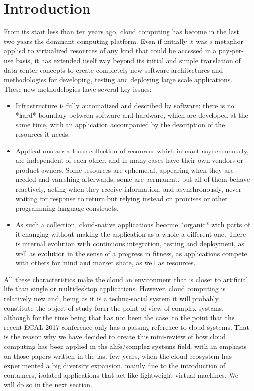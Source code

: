 \documentclass[utf8]{frontiersSCNS} %
\begin{document}
\section{Introduction}

From its start less than ten years ago, cloud computing
\citep{armbrust2010view,qian2009cloud} has become in the last two
years the dominant computing platform. Even if initially it was a
metaphor applied to virtualized resources of any kind that could be
accessed in a pay-per-use basis, it has extended itself way beyond its
initial and simple translation of data center concepts to create
completely new software architectures and methodologies for
developing, testing and deploying large scale applications. 
These new methodologies have several key issues:

\begin{itemize}

\item Infrastructure is fully automatized and described by software;
  there is no *hard* boundary between software and hardware, which are
  developed at the same time, with an application accompanied by the
  description of the resources it needs.  

\item  Applications are a loose collection of resources which interact
  asynchronously, are independent of each other, and in many cases
  have their own vendors or product owners. Some resources are
  ephemeral, appearing when they are needed and vanishing afterwards,
  some are permanent, but all of them behave reactively, acting when
  they receive information, and asynchronously, never waiting for
  response to return but relying instead on promises or other
  programming language constructs. 

\item  As such a collection, cloud-native applications become *organic*
  with parts of it changing without making the application as a whole
  a different one. There is internal evolution with continuous
  integration, testing and deployment, as well as evolution in the
  sense of a progress in fitness, as applications compete with others
  for mind and market share, as well as resources. 
\end{itemize}

All these characteristics make the cloud an environment that is closer
to artificial life than single or multidesktop applications. However,
cloud computing is relatively new and, being as it is a techno-social
system \citep{vespignani2009predicting,JJ2016} it will probably constitute
the object of study form the point of view of complex systems,
although for the time being that has not been the case, to the point
that the recent ECAL 2017 conference \citep{ecal17} only has a passing reference to
cloud systems. That is the reason why we have decided to create this
mini-review of how cloud computing has been applied in the
alife/complex systems field, with an emphasis on those papers written
in the last few years, when the cloud ecosystem has experimented a big
diversity expansion, mainly due to the introduction of containers,
isolated applications that act like lightweight virtual machines. We
will do so in the next section.
\end{document}
